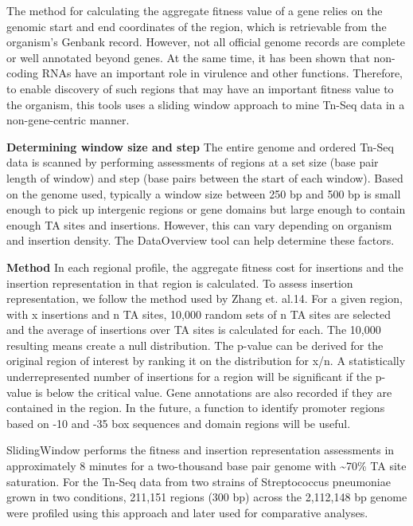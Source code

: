 \documentclass[11pt,]{article}
\begin{document}
The method for calculating the aggregate fitness value of a gene relies
on the genomic start and end coordinates of the region, which is
retrievable from the organism's Genbank record. However, not all
official genome records are complete or well annotated beyond genes. At
the same time, it has been shown that non-coding RNAs have an important
role in virulence and other functions. Therefore, to enable discovery of
such regions that may have an important fitness value to the organism,
this tools uses a sliding window approach to mine Tn-Seq data in a
non-gene-centric manner.

\textbf{Determining window size and step} The entire genome and ordered
Tn-Seq data is scanned by performing assessments of regions at a set
size (base pair length of window) and step (base pairs between the start
of each window). Based on the genome used, typically a window size
between 250 bp and 500 bp is small enough to pick up intergenic regions
or gene domains but large enough to contain enough TA sites and
insertions. However, this can vary depending on organism and insertion
density. The DataOverview tool can help determine these factors.

\textbf{Method} In each regional profile, the aggregate fitness cost for
insertions and the insertion representation in that region is
calculated. To assess insertion representation, we follow the method
used by Zhang et. al.14. For a given region, with x insertions and n TA
sites, 10,000 random sets of n TA sites are selected and the average of
insertions over TA sites is calculated for each. The 10,000 resulting
means create a null distribution. The p-value can be derived for the
original region of interest by ranking it on the distribution for x/n. A
statistically underrepresented number of insertions for a region will be
significant if the p-value is below the critical value. Gene annotations
are also recorded if they are contained in the region. In the future, a
function to identify promoter regions based on -10 and -35 box sequences
and domain regions will be useful.

SlidingWindow performs the fitness and insertion representation
assessments in approximately 8 minutes for a two-thousand base pair
genome with \textasciitilde{}70\% TA site saturation. For the Tn-Seq
data from two strains of Streptococcus pneumoniae grown in two
conditions, 211,151 regions (300 bp) across the 2,112,148 bp genome were
profiled using this approach and later used for comparative analyses.
\end{document}
